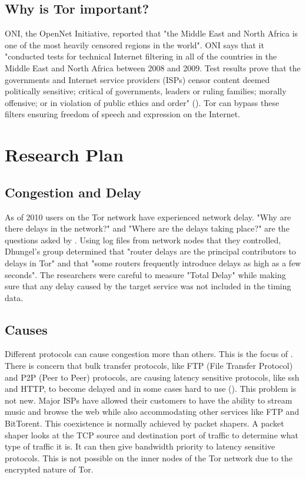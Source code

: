 \documentclass[letterpaper,13pt]{texMemo}
\begin{document}
    \subsection*{Why is Tor important?}
    ONI, the OpenNet Initiative, reported that "the Middle East and North Africa is one of the most
    heavily censored regions in the world". ONI says that it "conducted tests for technical
    Internet filtering in all of the countries in the Middle East and North Africa between 2008 and
    2009. Test results prove that the governments and Internet service providers (ISPs) censor
    content deemed politically sensitive; critical of governments, leaders or ruling families;
    morally offensive; or in violation of public ethics and order" (\citeauthor[6]{ONI}). Tor can
    bypass these filters ensuring freedom of speech and expression on the Internet.

\section*{Research Plan}


    \subsection*{Congestion and Delay}
    As of 2010 users on the Tor network have experienced network delay.  "Why are there delays in
    the network?" and "Where are the delays taking place?" are the questions asked by
    \citeauthor[]{delay}. Using log files from network nodes that they controlled, Dhungel's group
    determined that "router delays are the principal contributors to delays in Tor" and that "some
    routers frequently introduce delays as high as a few seconds". The researchers were careful to
    measure "Total Delay" while making sure that any delay caused by the target service was not included
    in the timing data.

    \subsection*{Causes}
    Different protocols can cause congestion more than others. This is the focus of
    \citeauthor{analysis}. There is concern that bulk transfer protocols, like FTP (File Transfer
    Protocol) and P2P (Peer to Peer) protocols, are causing latency sensitive protocols, like ssh
    and HTTP, to become delayed and in some cases hard to use (\citeauthor[2]{analysis}). This
    problem is not new. Major ISPs have allowed their customers to have the ability to stream music
    and browse the web while also accommodating other services like FTP and BitTorent. This
    coexistence is normally achieved by packet shapers. A packet shaper looks at the TCP source and
    destination port of traffic to determine what type of traffic it is. It can then give
    bandwidth priority to latency sensitive protocols. This is not possible on the inner nodes of
    the Tor network due to the encrypted nature of Tor.
\end{document}
